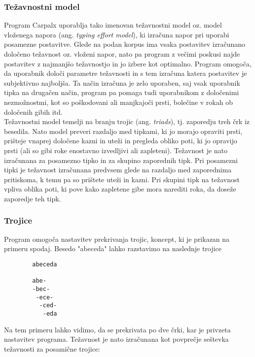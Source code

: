    \subsubsection{Težavnostni model}

    Program Carpalx uporablja tako imenovan težavnostni model oz. model vloženega napora (ang. \emph{typing effort model}), ki izračuna napor pri uporabi posamezne postavitve.
    Glede na podan korpus ima vsaka postavitev izračunano določeno težavnost oz. vloženi napor, nato pa program z večimi poskusi najde postavitev z najmanjšo težavnostjo in jo izbere kot optimalno.
    Program omogoča, da uporabnik določi parametre težavnosti in s tem izračuna katera postavitev je subjektivno najboljša.
    Ta način izračuna je zelo uporaben, saj vsak uporabnik tipka na drugačen način, program pa pomaga tudi uporabnikom z določenimi nezmožnostmi,
    kot so poškodovani ali manjkajoči prsti, bolečine v rokah ob določenih gibih itd. \\

    Težavnostni model temelji na branju trojic (ang. \emph{triads}), tj. zaporedju treh črk iz besedila.
    Nato model preveri razdaljo med tipkami, ki jo morajo opraviti prsti, prišteje vnaprej določene kazni in uteži in pregleda obliko poti,
    ki jo opravijo prsti (ali so gibi roke enostavno izvedljivi ali zapleteni).
    Težavnost je nato izračunana za posamezno tipko in za skupino zaporednih tipk.
    Pri posamezni tipki je težavnost izračunana predvsem glede na razdaljo med zaporednima pritiskoma, k temu pa so prištete uteži in kazni.
    Pri skupini tipk na težavnost vpliva oblika poti, ki pove kako zapletene gibe mora narediti roka, da doseže zaporedje teh tipk.

    \subsubsection{Trojice}

    Program omogoča nastavitev prekrivanja trojic, koncept, ki je prikazan na primeru spodaj.
    Besedo "abeceda" lahko razstavimo na naslednje trojice

    \begin{verbatim}
        abeceda

        abe-
        -bec-
         -ece-
          -ced-
           -eda
    \end{verbatim}

    Na tem primeru lahko vidimo, da se prekrivata po dve črki, kar je privzeta nastavitev programa.
    Težavnost je nato izračunana kot povprečje seštevka težavnosti za posamične trojice: \\

